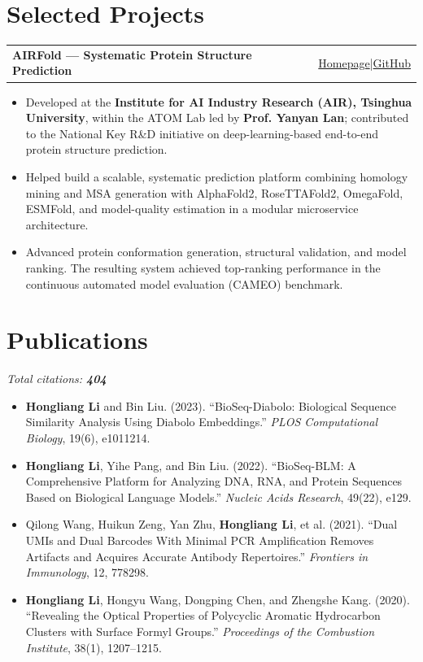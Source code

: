 \documentclass[10pt,a4paper]{article}
\makeatletter
\newcommand{\CVCitations}{404}
\newenvironment{detailitems}{%
  \begin{itemize}[leftmargin=2.15em,label=$\circ$,itemsep=0.20em,topsep=0.16em,parsep=0pt,partopsep=0pt]
}{\end{itemize}}
\newcommand{\project}[2]{%
  \noindent\begin{tabularx}{\linewidth}{@{}>{\raggedright\arraybackslash}Xr@{}}
    \textbullet\enspace\textbf{#1} & #2
  \end{tabularx}\par\vspace{0.08em}
}
\newcommand{\publication}[1]{%
  \begin{itemize}[leftmargin=1.18em,label=\textbullet,itemsep=0.32em,topsep=0.14em,parsep=0pt,partopsep=0pt]
    \item #1
  \end{itemize}
}
\makeatother
\begin{document}
\section{Selected Projects}
\project{AIRFold — Systematic Protein Structure Prediction}{\href{https://atomlab.yanyanlan.com/project/airfold/}{Homepage}\enspace |\enspace \href{https://github.com/THU-ATOM/AIRFold}{GitHub}}
\begin{detailitems}
  \item Developed at the \textbf{Institute for AI Industry Research (AIR), Tsinghua University}, within the ATOM Lab led by \textbf{Prof. Yanyan Lan}; contributed to the National Key R\&D initiative on deep-learning-based end-to-end protein structure prediction.
  \item Helped build a scalable, systematic prediction platform combining homology mining and MSA generation with AlphaFold2, RoseTTAFold2, OmegaFold, ESMFold, and model-quality estimation in a modular microservice architecture.
  \item Advanced protein conformation generation, structural validation, and model ranking. The resulting system achieved top-ranking performance in the continuous automated model evaluation (CAMEO) benchmark.
\end{detailitems}

\section{Publications}
\noindent\hfill{\small\textit{Total citations: \textbf{\CVCitations}}}\par
\vspace{0.12em}
\publication{\textbf{Hongliang Li} and Bin Liu. (2023). ``BioSeq-Diabolo: Biological Sequence Similarity Analysis Using Diabolo Embeddings.'' \textit{PLOS Computational Biology}, 19(6), e1011214.}

\publication{\textbf{Hongliang Li}, Yihe Pang, and Bin Liu. (2022). ``BioSeq-BLM: A Comprehensive Platform for Analyzing DNA, RNA, and Protein Sequences Based on Biological Language Models.'' \textit{Nucleic Acids Research}, 49(22), e129.}

\publication{Qilong Wang, Huikun Zeng, Yan Zhu, \textbf{Hongliang Li}, et al. (2021). ``Dual UMIs and Dual Barcodes With Minimal PCR Amplification Removes Artifacts and Acquires Accurate Antibody Repertoires.'' \textit{Frontiers in Immunology}, 12, 778298.}

\publication{\textbf{Hongliang Li}, Hongyu Wang, Dongping Chen, and Zhengshe Kang. (2020). ``Revealing the Optical Properties of Polycyclic Aromatic Hydrocarbon Clusters with Surface Formyl Groups.'' \textit{Proceedings of the Combustion Institute}, 38(1), 1207--1215.}
\end{document}
